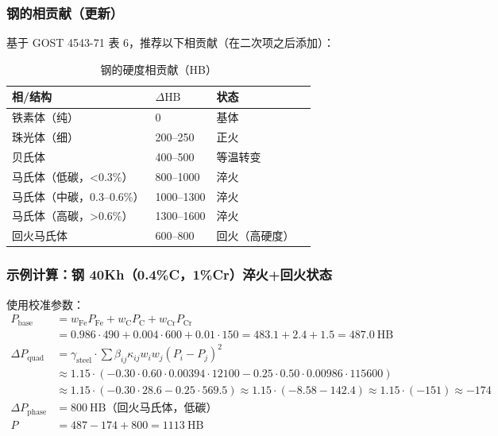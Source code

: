 \documentclass[12pt,a4paper]{article}
\begin{document}
	\subsubsection{钢的相贡献（更新）}
	基于 GOST 4543-71 表 6，推荐以下相贡献（在二次项之后添加）：
	
	\begin{longtable}{p{3.5cm} p{3.0cm} p{3.0cm} p{4cm}}
		\caption{钢的硬度相贡献（HB）}\label{tab:steel_phase_contrib_gost4543}\\
		\toprule
		\textbf{相/结构} & $\Delta\text{HB}$ & \textbf{状态} \\
		\midrule
		铁素体（纯） & 0 & 基体 \\
		珠光体（细） & 200–250 & 正火 \\
		贝氏体 & 400–500 & 等温转变 \\
		马氏体（低碳，<0.3\%） & 800–1000 & 淬火 \\
		马氏体（中碳，0.3–0.6\%） & 1000–1300 & 淬火 \\
		马氏体（高碳，>0.6\%） & 1300–1600 & 淬火 \\
		回火马氏体 & 600–800 & 回火（高硬度） \\
		\bottomrule
	\end{longtable}
	
	\subsubsection{示例计算：钢 40Kh（0.4\%C，1\%Cr）淬火+回火状态}
	使用校准参数：
	\[
	\begin{aligned}
		P_{\text{base}} &= w_{\text{Fe}} P_{\text{Fe}} + w_{\text{C}} P_{\text{C}} + w_{\text{Cr}} P_{\text{Cr}} \\
		&= 0.986\cdot490 + 0.004\cdot600 + 0.01\cdot150 = 483.1 + 2.4 + 1.5 = 487.0\ \text{HB} \\
		\Delta P_{\text{quad}} &= \gamma_{\text{steel}} \cdot \sum \beta_{ij} \kappa_{ij} w_i w_j (P_i-P_j)^2 \\
		&\approx 1.15 \cdot ( -0.30 \cdot 0.60 \cdot 0.00394 \cdot 12100 -0.25 \cdot 0.50 \cdot 0.00986 \cdot 115600 ) \\
		&\approx 1.15 \cdot ( -0.30 \cdot 28.6 -0.25 \cdot 569.5 ) \approx 1.15 \cdot ( -8.58 -142.4 ) \approx 1.15 \cdot (-151) \approx -174 \\
		\Delta P_{\text{phase}} &= 800\ \text{HB（回火马氏体，低碳）} \\
		P &= 487 - 174 + 800 = 1113\ \text{HB}
	\end{aligned}
	\]
	
\end{document}

